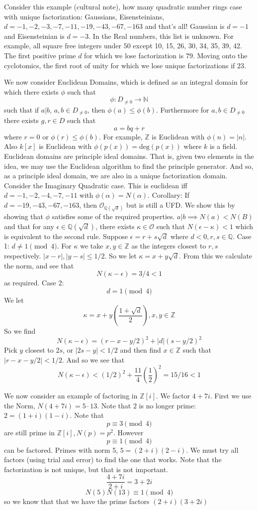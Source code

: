 \documentclass{article}
\begin{document}
Consider this example (cultural note), how many quadratic number rings case with
unique factorization:
Gaussians, Eisensteinians, $d = -1,-2,-3,-7,-11,-19,-43,-67,-163$ and that's
all! Gaussian is $d = -1$ and Eisensteinian is  $d = -3$. In the Real numbers,
this list is unknown. For example, all square free integers under $50$ except
10, 15, 26, 30, 34, 35, 39, 42. The first positive prime $d$ for which we lose
factorization is $79$. Moving onto the cyclotomics, the first root of unity for
which we lose unique factorizations if $23$. 

We now consider Euclidean Domains, which is defined as an integral domain for
which there exists $\phi$ such that
\[ \phi: D_{\neq 0} \rightarrow \mathbb{N} \]
such that if $a|b$, $a,b \in D_{\neq 0}$, then $\phi(a) \leq \phi(b)$.
Furthermore for $a,b \in D_{\neq 0}$ there exists $g,r \in D$ such that
\[ a = bq + r \]
where $r = 0$ or $\phi(r) \leq \phi(b)$. For example, $\mathbb{Z}$ is Euclidean
with $\phi(n) = |n|$. Also $k[x]$ is Euclidean with $\phi(p(x)) =
\text{deg}(p(x))$ where $k$ is a field. Euclidean domains are principle ideal
domains. That is, given two elements in the idea, we may use the Euclidean
algorithm to find the principle generator. And so, as a principle ideal domain,
we are also in a unique factorization domain. Consider the Imaginary Quadratic
case. This is euclidean iff $d = -1, -2, -4, -7, -11$ with $\phi(\alpha) =
N(\alpha)$. Corollary: If $d = -19, -43, -67, -163$, then
$\mathcal{O}_{\mathbb{Q}(\sqrt{d})}$ but is still a UFD\@. We show this by showing
that $\phi$ satisfies some of the required properties. $a|b \implies N(a) <
N(B)$ and that for any $\epsilon \in \mathbb{Q}(\sqrt{d})$,  there exists
$\kappa \in \mathcal{O}$ such that $N(\epsilon - \kappa) < 1 $ which is
equivalent to the second rule. Suppose $\epsilon = r + s \sqrt{d}$ where $d <
0, r,s \in \mathbb{Q}$. Case 1: $d \neq 1 \pmod{4}$. For $\kappa$ we take $x,y\in
\mathbb{Z}$ as the integers closest to $r,s$ respectively. $|x-r|,|y-s| \leq
1/2$. So we let $\kappa = x + y \sqrt{d}$. From this we calculate the norm, and
see that 
\[ N(\kappa - \epsilon) = 3/4 < 1 \]
as required. Case 2: 
\[ d = 1 \pmod{4} \]
We let 
\[ \kappa = x + y\left( \frac{1 + \sqrt{d}}{2} \right), x,y\in \mathbb{Z}\]
So we find
\[ N(\kappa - \epsilon) = (r - x - y/2)^2 + |d|(s - y/2)^2 \]
Pick $y$ closest to $2s$, or $|2s - y| < 1/2$ and then find $x \in \mathbb{Z}$
such that $|r -x - y/2| < 1/2$.
And so we see that
\[ N(\kappa - \epsilon) < (1/2)^2 + \frac{11}{4}\left(\frac{1}{2}\right)^2 =
15/16 < 1 \]

We now consider an example of factoring in $\mathbb{Z}[i]$. We factor $4+7i$.
First we use the Norm, $N(4+7i) = 5 \cdot 13 $. Note that $2$ is no longer
prime: $2 = (1+i)(1-i)$.  Note that
\[ p \equiv 3 \pmod{4} \]
are still prime in $\mathbb{Z}[i], N(p) = p^2$. However 
\[ p \equiv 1 \pmod{4} \]
can be factored. Primes with norm 5, $5 = (2+i)(2-i)$. We must try all factors
(using trial and error) to find the one that works. Note that the factorization
is not unique, but that is not important.
\[ \frac{4+7i}{2+i} = 3 + 2i \]
\[ N(5) N(13) \equiv 1 \pmod{4} \]
so we know that that we have the prime factors $(2+i)(3+2i)$
\end{document}
